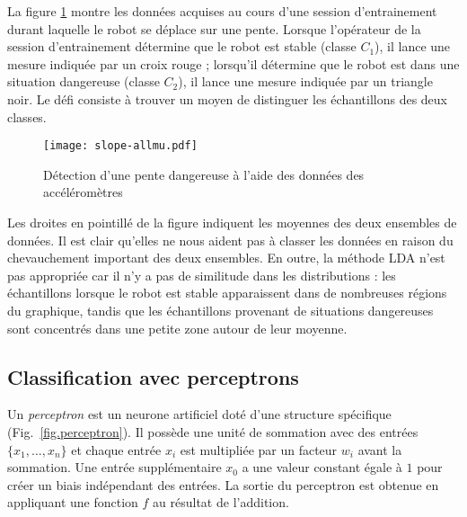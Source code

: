La figure \ref{fig.slopemes} montre les données acquises au cours d'une session d’entrainement durant laquelle le robot se déplace sur une pente. Lorsque l'opérateur de la session d’entrainement détermine que le robot est stable (classe $C_1$), il lance une mesure indiquée par un croix rouge ; lorsqu'il détermine que le robot est dans une situation dangereuse (classe $C_2$), il lance une mesure indiquée par un triangle noir. Le défi consiste à trouver un moyen de distinguer les échantillons des deux classes.

\begin{figure}
\begin{center}
\texttt{[image: slope-allmu.pdf]}
\end{center}
\caption{Détection d'une pente dangereuse à l'aide des données des accéléromètres}\label{fig.slopemes}
\end{figure}
Les droites en pointillé de la figure indiquent les moyennes des deux ensembles de données. Il est clair qu'elles ne nous aident pas à classer les données en raison du chevauchement important des deux ensembles. En outre, la méthode LDA n'est pas appropriée car il n'y a pas de similitude dans les distributions : les échantillons lorsque le robot est stable apparaissent dans de nombreuses régions du graphique, tandis que les échantillons provenant de situations dangereuses sont concentrés dans une petite zone autour de leur moyenne.

\subsection{Classification avec perceptrons}

Un \emph{perceptron} est un neurone artificiel doté d'une structure spécifique (Fig.~\ref{fig.perceptron}). Il possède une unité de sommation avec des entrées $\{x_1,\ldots,x_n\}$ et chaque entrée $x_i$ est multipliée par un facteur $w_i$ avant la sommation. Une entrée supplémentaire $x_0$ a une valeur constant égale à $1$ pour créer un biais indépendant des entrées. La sortie du perceptron est obtenue en appliquant une fonction $f$ au résultat de l'addition.

